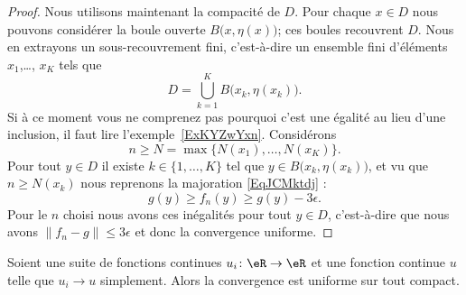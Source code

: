 \begin{proof}
    Nous utilisons maintenant la compacité de \( D\). Pour chaque \( x\in D\) nous pouvons considérer la boule ouverte \( B\big( x,\eta(x) \big)\); ces boules recouvrent \( D\). Nous en extrayons un sous-recouvrement fini, c'est-à-dire un ensemble fini d'éléments \( x_1\),\ldots, \( x_K\) tels que
    \begin{equation}
        D=\bigcup_{k=1}^K B\big(x_k,\eta(x_k)\big).
    \end{equation}
    Si à ce moment vous ne comprenez pas pourquoi c'est une égalité au lieu d'une inclusion, il faut lire l'exemple~\ref{ExKYZwYxn}. Considérons
    \begin{equation}
        n\geq N=\max\{ N(x_1),\ldots, N(x_K) \}.
    \end{equation}
    Pour tout \( y\in D\) il existe \( k\in\{ 1,\ldots, K \}\) tel que \( y\in B\big( x_k,\eta(x_k) \big)\), et vu que \( n\geq N(x_k)\) nous reprenons la majoration \eqref{EqJCMktdj} :
    \begin{equation}
        g(y)\geq f_n(y)\geq g(y)-3\epsilon.
    \end{equation}
    Pour le \( n\) choisi nous avons ces inégalités pour tout \( y\in D\), c'est-à-dire que nous avons \( \| f_n-g \|\leq 3\epsilon\) et donc la convergence uniforme.
\end{proof}

\begin{proposition}      \label{PROPooFWVIooCzXojO}
    Soient une suite de fonctions continues \( u_i\colon \eR\to \eR\) et une fonction continue \( u\) telle que \( u_i\to u\) simplement. Alors la convergence est uniforme sur tout compact.
\end{proposition}

